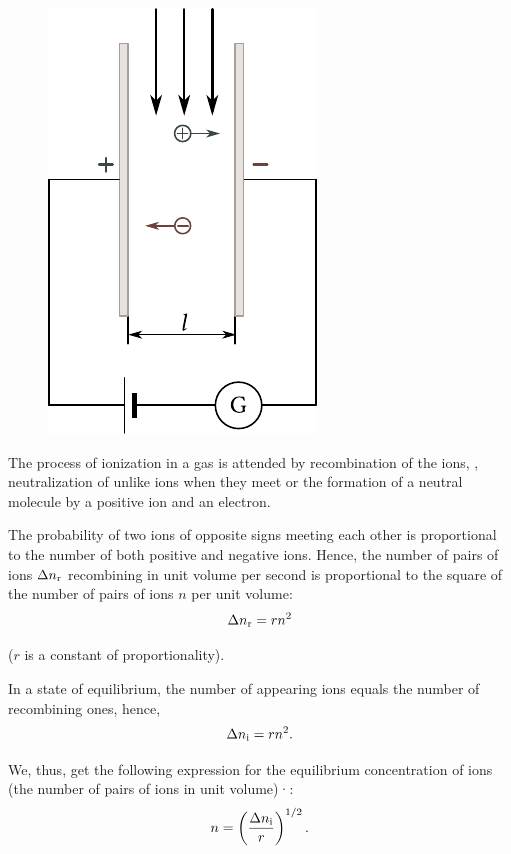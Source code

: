 \begin{figure}[t]
	\begin{center}
		\includegraphics[scale=1]{figures/ch_12/fig_12_1.pdf}
		\caption[]{}
		\label{fig:12_1}
	\end{center}
	\vspace{-0.8cm}
\end{figure}

The process of ionization in a gas is attended by recombination of the ions, \ie, neutralization of unlike ions when they meet or the formation of a neutral molecule by a positive ion and an electron.

The probability of two ions of opposite signs meeting each other is proportional to the number of both positive and negative ions.
Hence, the number of pairs of ions $\Delta{n_{\text{r}}}$ recombining in unit volume per second is proportional to the square of the number of pairs of ions $n$ per unit volume:
\begin{equation}\label{eq:12_1}
    \Delta{n_{\text{r}}} = rn^2
\end{equation}

\noindent
($r$ is a constant of proportionality).

In a state of equilibrium, the number of appearing ions equals the number of recombining ones, hence,
\begin{equation}\label{eq:12_2}
    \Delta{n_{\text{i}}} = rn^2.
\end{equation}

\noindent
We, thus, get the following expression for the equilibrium concentration of ions (the number of pairs of ions in unit volume)·:
\begin{equation}\label{eq:12_3}
    n = \left(\frac{\Delta{n_{\text{i}}}}{r}\right)^{1/2}.
\end{equation}

